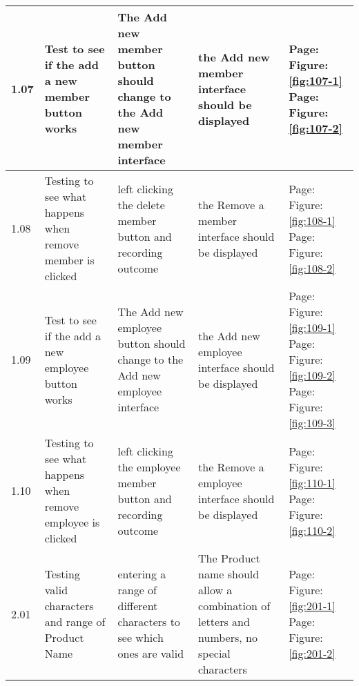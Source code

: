 \begin{flushleft}
\begin{longtable}{|p{1cm}|p{2.5cm}|p{2.5cm}|p{2cm}|p{2cm}|}
	1.07 & Test to see if the add a new member button works & The Add new member button should change to the Add new member interface & the Add new member interface should be displayed&  Page:\pageref{fig:107-1}  \newline Figure:\ref{fig:107-1} \newline  \newline Page:\pageref{fig:107-2}  \newline Figure:\ref{fig:107-2}\\ \hline
	1.08 & Testing to see what happens when remove member is clicked & left clicking the delete member button and recording outcome & the Remove a member interface should be displayed &  Page:\pageref{fig:108-1}  \newline Figure:\ref{fig:108-1} \newline  \newline Page:\pageref{fig:108-2}  \newline Figure:\ref{fig:108-2}\\ \hline
	1.09 & Test to see if the add a new employee button works & The Add new employee button should change to the Add new employee interface &  the Add new employee interface should be displayed&   Page:\pageref{fig:109-1}  \newline Figure:\ref{fig:109-1} \newline  \newline Page:\pageref{fig:109-2}  \newline Figure:\ref{fig:109-2} \newline  \newline  Page:\pageref{fig:109-3}  \newline Figure:\ref{fig:109-3}\\ \hline
	1.10 & Testing to see what happens when remove employee is clicked & left clicking the employee member button and recording outcome & the Remove a employee interface should be displayed &  Page:\pageref{fig:110-1}  \newline Figure:\ref{fig:110-1}  \newline  \newline Page:\pageref{fig:110-2}  \newline Figure:\ref{fig:110-2}\\ \hline
	2.01 & Testing valid characters and range of Product Name & entering a range of different characters to see which ones are valid & The Product name should allow a combination of letters and numbers, no special characters & Page:\pageref{fig:201-1}  \newline Figure:\ref{fig:201-1}  \newline  \newline Page:\pageref{fig:201-2}  \newline Figure:\ref{fig:201-2}\\ \hline

\end{longtable}
\end{flushleft}
